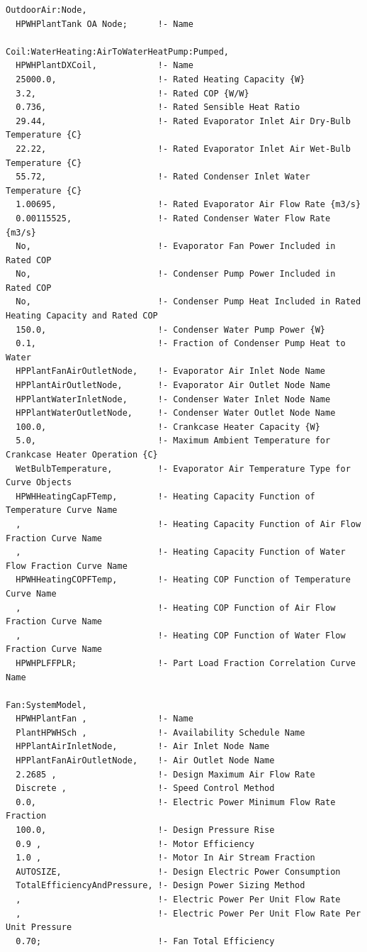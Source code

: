 \begin{lstlisting}
OutdoorAir:Node,
  HPWHPlantTank OA Node;      !- Name

Coil:WaterHeating:AirToWaterHeatPump:Pumped,
  HPWHPlantDXCoil,            !- Name
  25000.0,                    !- Rated Heating Capacity {W}
  3.2,                        !- Rated COP {W/W}
  0.736,                      !- Rated Sensible Heat Ratio
  29.44,                      !- Rated Evaporator Inlet Air Dry-Bulb Temperature {C}
  22.22,                      !- Rated Evaporator Inlet Air Wet-Bulb Temperature {C}
  55.72,                      !- Rated Condenser Inlet Water Temperature {C}
  1.00695,                    !- Rated Evaporator Air Flow Rate {m3/s}
  0.00115525,                 !- Rated Condenser Water Flow Rate {m3/s}
  No,                         !- Evaporator Fan Power Included in Rated COP
  No,                         !- Condenser Pump Power Included in Rated COP
  No,                         !- Condenser Pump Heat Included in Rated Heating Capacity and Rated COP
  150.0,                      !- Condenser Water Pump Power {W}
  0.1,                        !- Fraction of Condenser Pump Heat to Water
  HPPlantFanAirOutletNode,    !- Evaporator Air Inlet Node Name
  HPPlantAirOutletNode,       !- Evaporator Air Outlet Node Name
  HPPlantWaterInletNode,      !- Condenser Water Inlet Node Name
  HPPlantWaterOutletNode,     !- Condenser Water Outlet Node Name
  100.0,                      !- Crankcase Heater Capacity {W}
  5.0,                        !- Maximum Ambient Temperature for Crankcase Heater Operation {C}
  WetBulbTemperature,         !- Evaporator Air Temperature Type for Curve Objects
  HPWHHeatingCapFTemp,        !- Heating Capacity Function of Temperature Curve Name
  ,                           !- Heating Capacity Function of Air Flow Fraction Curve Name
  ,                           !- Heating Capacity Function of Water Flow Fraction Curve Name
  HPWHHeatingCOPFTemp,        !- Heating COP Function of Temperature Curve Name
  ,                           !- Heating COP Function of Air Flow Fraction Curve Name
  ,                           !- Heating COP Function of Water Flow Fraction Curve Name
  HPWHPLFFPLR;                !- Part Load Fraction Correlation Curve Name

Fan:SystemModel,
  HPWHPlantFan ,              !- Name
  PlantHPWHSch ,              !- Availability Schedule Name
  HPPlantAirInletNode,        !- Air Inlet Node Name
  HPPlantFanAirOutletNode,    !- Air Outlet Node Name
  2.2685 ,                    !- Design Maximum Air Flow Rate
  Discrete ,                  !- Speed Control Method
  0.0,                        !- Electric Power Minimum Flow Rate Fraction
  100.0,                      !- Design Pressure Rise
  0.9 ,                       !- Motor Efficiency
  1.0 ,                       !- Motor In Air Stream Fraction
  AUTOSIZE,                   !- Design Electric Power Consumption
  TotalEfficiencyAndPressure, !- Design Power Sizing Method
  ,                           !- Electric Power Per Unit Flow Rate
  ,                           !- Electric Power Per Unit Flow Rate Per Unit Pressure
  0.70;                       !- Fan Total Efficiency
\end{lstlisting}

